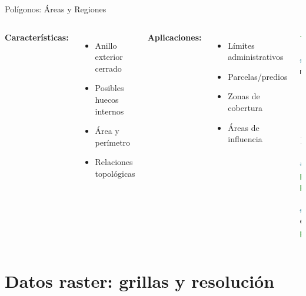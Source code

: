 \documentclass[10pt,aspectratio=169]{beamer}
\begin{document}
\begin{frame}[fragile]{Polígonos: Áreas y Regiones}
    \begin{columns}[T]
        \textbf{Características:}
        \begin{itemize}
            \item Anillo exterior cerrado
            \item Posibles huecos internos
            \item Área y perímetro
            \item Relaciones topológicas
        \end{itemize}
        
        \textbf{Aplicaciones:}
        \begin{itemize}
            \item Límites administrativos
            \item Parcelas/predios
            \item Zonas de cobertura
            \item Áreas de influencia
        \end{itemize}
        
        \begin{lstlisting}[language=Python]
from shapely.geometry import Polygon

# Crear poligono
manzana = Polygon([
    (-70.650, -33.440),
    (-70.648, -33.440),
    (-70.648, -33.438),
    (-70.650, -33.438),
    (-70.650, -33.440)
])

# Propiedades
print(f"Area: {manzana.area}")
print(f"Perimetro: {manzana.length}")

# Operaciones espaciales
edificio = Point(-70.649, -33.439)
print(manzana.contains(edificio))
        \end{lstlisting}
    \end{columns}
\end{frame}

\section{Datos raster: grillas y resolución}
\end{document}
